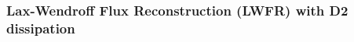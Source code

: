 \documentclass{beamer}
\begin{document}
{{\begin{frame}
  {}
\end{frame}}{\begin{frame}
  \frametitle{Lax-Wendroff Flux Reconstruction (LWFR) with D2 dissipation}
  

\end{frame}}}
\end{document}
